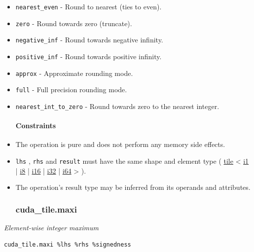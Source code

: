 \documentclass{article}
\begin{document}
\begin{itemize}
\item \texttt{nearest\_even} - Round to nearest (ties to even).
\item \texttt{zero} - Round towards zero (truncate).
\item \texttt{negative\_inf} - Round towards negative infinity.
\item \texttt{positive\_inf} - Round towards positive infinity.
\item \texttt{approx} - Approximate rounding mode.
\item \texttt{full} - Full precision rounding mode.
\item \texttt{nearest\_int\_to\_zero} - Round towards zero to the nearest integer.


\paragraph{Constraints}

\item The operation is pure and does not perform any memory side effects.
\item \texttt{lhs} , \texttt{rhs} and \texttt{result} must have the same shape and element type ( \href{https://docs.nvidia.com/cuda/tile-ir/latest/sections/types.html#type-tile}{tile} < \href{https://docs.nvidia.com/cuda/tile-ir/latest/sections/types.html#subsection-element-types}{i1} | \href{https://docs.nvidia.com/cuda/tile-ir/latest/sections/types.html#subsection-element-types}{i8} | \href{https://docs.nvidia.com/cuda/tile-ir/latest/sections/types.html#subsection-element-types}{i16} | \href{https://docs.nvidia.com/cuda/tile-ir/latest/sections/types.html#subsection-element-types}{i32} | \href{https://docs.nvidia.com/cuda/tile-ir/latest/sections/types.html#subsection-element-types}{i64} > ).
\item The operation's result type may be inferred from its operands and attributes.


\subsubsection{cuda\_tile.maxi}

\end{itemize}
\textit{Element-wise integer maximum}


\begin{lstlisting}
cuda_tile.maxi %lhs %rhs %signedness
\end{lstlisting}
\end{document}
